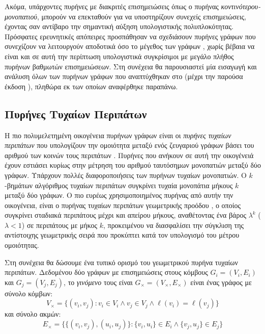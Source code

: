 Ακόμα, υπάρχοντες πυρήνες με διακριτές επισημειώσεις όπως ο πυρήνας \textit{κοντινότερου-μονοπατιού}, μπορούν να επεκταθούν για να υποστηρίζουν συνεχείς επισημειώσεις, έχοντας σαν αντίβαρο την σημαντική αύξηση υπολογιστικής πολυπλοκότητας.
Πρόσφατες ερευνητικές απόπειρες προσπάθησαν να σχεδιάσουν πυρήνες γράφων που συνεχίζουν να λειτουργούν αποδοτικά όσο το μέγεθος των γράφων \cite{Feragen13, Orsini2015, Morris16}, χωρίς βέβαια να είναι και σε αυτή την περίπτωση υπολογιστικά συγκρίσιμοι με μεγάλο πλήθος πυρήνων βαθμωτών επισημειώσεων.
Στη συνέχεια θα παρουσιαστεί μία εισαγωγή και ανάλυση όλων των πυρήνων γράφων που αναπτύχθηκαν στο  (μέχρι την παρούσα έκδοση ), πληθώρα εκ των οποίων αναφέρθηκε παραπάνω.
\subsection{Πυρήνες Τυχαίων Περιπάτων}
\label{ssec:rw}
Η πιο πολυμελετημένη οικογένεια πυρήνων γράφων είναι οι \textit{πυρήνες τυχαίων περιπάτων} που υπολογίζουν την ομοιότητα μεταξύ ενός ζευγαριού γράφων βάσει του αριθμού των κοινών τους περιπάτων \cite{kashima2003marginalized,gartner2003graph,mahe2004extensions,borgwardt2005protein,vishwanathan2010graph,sugiyama2015halting}.
Πυρήνες που ανήκουν σε αυτή την οικογένειά έχουν εστιάσει κυρίως στην μέτρηση του αριθμού ταυτόσημων μονοπατιών μεταξύ δύο γράφων.
Υπάρχουν πολλές διαφοροποιήσεις των πυρήνων τυχαίων μονοπατιών.
Ο $k$-βημάτων αλγόριθμος τυχαίων περιπάτων συγκρίνει τυχαία μονοπάτια μήκους $k$ μεταξύ δύο γράφων.
Ο πιο ευρέως χρησιμοποιημένος πυρήνας από αυτήν την οικογένεια, είναι ο πυρήνας τυχαίων περιπάτων γεωμετρικής προόδου \cite{gartner2003graph}, ο οποίος συγκρίνει σταδιακά περιπάτους μέχρι και απείρου μήκους, αναθέτοντας ένα βάρος $\lambda^k$ ($\lambda < 1$) σε περιπάτους με μήκος $k$, προκειμένου να διασφαλίσει την σύγκλιση της αντίστοιχης γεωμετρικής σειρά που προκύπτει κατά τον υπολογισμό του μέτρου ομοιότητας.\par
Στη συνέχεια θα δώσουμε ένα τυπικό ορισμό του γεωμετρικού πυρήνα τυχαίων περιπάτων.
Δεδομένου δύο γράφων με επισημειώσεις στους κόμβους $G_i=(V_i,E_i)$ και $G_j=(V_j,E_j)$, το \textit{γινόμενο} τους είναι $G_\times=(V_\times,E_\times)$ είναι ένας γράφος με σύνολο κόμβων:
\begin{equation}
	V_{\times} = \{(v_i,v_j) : v_i \in V_i \wedge v_j \in V_j \wedge \ell(v_i) = \ell(v_j) \} 
\end{equation}
και σύνολο ακμών:
\begin{equation}
	E_{\times} = \{\{(v_i,v_j),(u_i,u_j)\} : \{v_i,u_i\} \in E_i \wedge \{v_j,u_j\} \in E_j\}
\end{equation}
